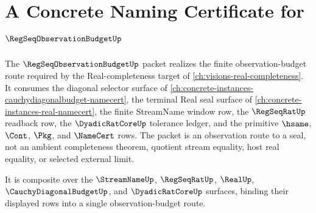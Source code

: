 \chapter{A Concrete Naming Certificate for $\RegSeqObservationBudgetUp$}
\label{ch:concrete-instances-regseqobservationbudget-namecert}

The $\RegSeqObservationBudgetUp$ packet realizes the finite observation-budget route required by the Real-completeness target of \autoref{ch:visions-real-completeness}. It consumes the diagonal selector surface of \autoref{ch:concrete-instances-cauchydiagonalbudget-namecert}, the terminal Real seal surface of \autoref{ch:concrete-instances-real-namecert}, the finite StreamName window row, the $\RegSeqRatUp$ readback row, the $\DyadicRatCoreUp$ tolerance ledger, and the primitive $\hsame$, $\Cont$, $\Pkg$, and $\NameCert$ rows. The packet is an observation route to a seal, not an ambient completeness theorem, quotient stream equality, host real equality, or selected external limit.

It is composite over the $\StreamNameUp$, $\RegSeqRatUp$, $\RealUp$, $\CauchyDiagonalBudgetUp$, and $\DyadicRatCoreUp$ surfaces, binding their displayed rows into a single observation-budget route.



